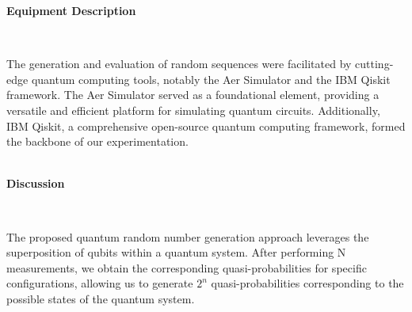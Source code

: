 \documentclass[12pt]{article}
\begin{document}
	   		{\raggedright\large\textbf{Equipment Description}}\\\par
	   		{The generation and evaluation of random sequences were facilitated by cutting-edge quantum computing tools, notably the
	   			Aer Simulator and the IBM Qiskit framework. The Aer Simulator served as a foundational element, providing a versatile and
	   			efficient platform for simulating quantum circuits. Additionally, IBM Qiskit, a comprehensive open-source quantum computing
	   			framework, formed the backbone of our experimentation.}\\\\
	   		{\raggedright\large\textbf{Discussion}}\\\par
	   		{The proposed quantum random number generation approach leverages the superposition of qubits within a quantum system.
	   			After performing N measurements, we obtain the corresponding quasi-probabilities for specific configurations, allowing us to
	   			generate $2^n$ quasi-probabilities corresponding to the possible states of the quantum system.}
   		
	   		
	   		
	
\end{document}

